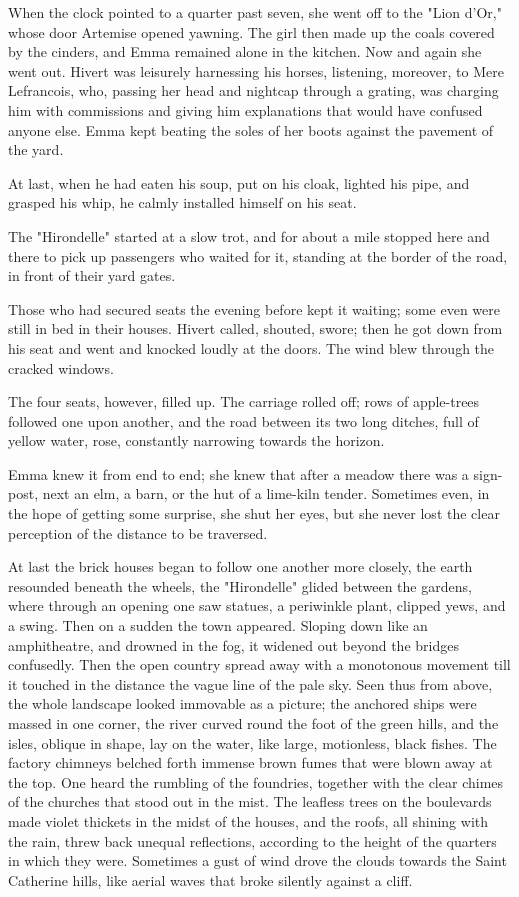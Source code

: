 \documentclass{tufte-book}
\begin{document}
When the clock pointed to a quarter past seven, she went off to the
"Lion d'Or," whose door Artemise opened yawning. The girl then made
up the coals covered by the cinders, and Emma remained alone in the
kitchen. Now and again she went out. Hivert was leisurely harnessing his
horses, listening, moreover, to Mere Lefrancois, who, passing her head
and nightcap through a grating, was charging him with commissions and
giving him explanations that would have confused anyone else. Emma kept
beating the soles of her boots against the pavement of the yard.

At last, when he had eaten his soup, put on his cloak, lighted his pipe,
and grasped his whip, he calmly installed himself on his seat.

The "Hirondelle" started at a slow trot, and for about a mile stopped
here and there to pick up passengers who waited for it, standing at the
border of the road, in front of their yard gates.

Those who had secured seats the evening before kept it waiting; some
even were still in bed in their houses. Hivert called, shouted, swore;
then he got down from his seat and went and knocked loudly at the doors.
The wind blew through the cracked windows.

The four seats, however, filled up. The carriage rolled off; rows of
apple-trees followed one upon another, and the road between its two long
ditches, full of yellow water, rose, constantly narrowing towards the
horizon.

Emma knew it from end to end; she knew that after a meadow there was
a sign-post, next an elm, a barn, or the hut of a lime-kiln tender.
Sometimes even, in the hope of getting some surprise, she shut her eyes,
but she never lost the clear perception of the distance to be traversed.

At last the brick houses began to follow one another more closely, the
earth resounded beneath the wheels, the "Hirondelle" glided between the
gardens, where through an opening one saw statues, a periwinkle plant,
clipped yews, and a swing. Then on a sudden the town appeared. Sloping
down like an amphitheatre, and drowned in the fog, it widened out
beyond the bridges confusedly. Then the open country spread away with
a monotonous movement till it touched in the distance the vague line of
the pale sky. Seen thus from above, the whole landscape looked immovable
as a picture; the anchored ships were massed in one corner, the river
curved round the foot of the green hills, and the isles, oblique in
shape, lay on the water, like large, motionless, black fishes. The
factory chimneys belched forth immense brown fumes that were blown away
at the top. One heard the rumbling of the foundries, together with the
clear chimes of the churches that stood out in the mist. The leafless
trees on the boulevards made violet thickets in the midst of the
houses, and the roofs, all shining with the rain, threw back unequal
reflections, according to the height of the quarters in which they were.
Sometimes a gust of wind drove the clouds towards the Saint Catherine
hills, like aerial waves that broke silently against a cliff.
\end{document}
